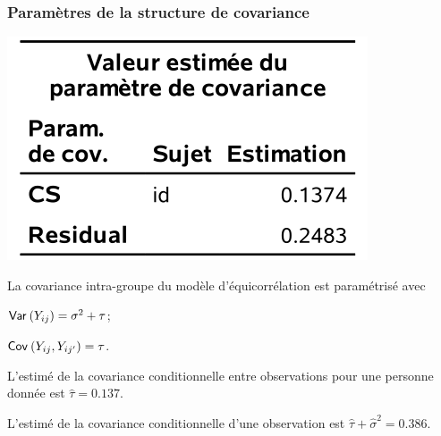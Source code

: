 \documentclass{beamer}
\begin{document}
% 

\begin{frame}[fragile]
\frametitle{Paramètres de la structure de covariance}
\begin{center}
\includegraphics[width = 0.4\linewidth]{img/c5/diapos6-e08}
\end{center}
\bi
\item La covariance intra-groupe du modèle d'équicorrélation est paramétrisé avec
\bi
\item ${\mathsf{Var}_{}}\left(Y_{ij}\right)=\sigma^2+\tau$;
\item ${\mathsf{Cov}_{}}\left(Y_{ij}, Y_{ij'}\right)=\tau$.
\ei
\item L'estimé de la covariance conditionnelle entre observations pour une personne donnée est $\hat{\tau}=0.137$.
\item L'estimé de la covariance conditionnelle d'une observation est $\hat{\tau}+ \hat{\sigma}^2= 0.386$.
\ei
\end{frame}
\end{document}
